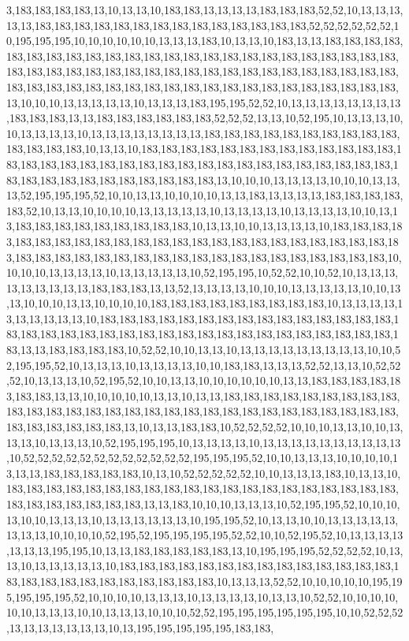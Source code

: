 3,183,183,183,183,13,10,13,13,10,183,183,13,13,13,13,183,183,183,52,52,10,13,13,13,13,13,183,183,183,183,183,183,183,183,183,183,183,183,183,183,52,52,52,52,52,52,10,195,195,195,10,10,10,10,10,10,13,13,13,183,10,13,13,10,183,13,13,183,183,183,183,183,183,183,183,183,183,183,183,183,183,183,183,183,183,183,183,183,183,183,183,183,183,183,183,183,183,183,183,183,183,183,183,183,183,183,183,183,183,183,183,183,183,183,183,183,183,183,183,183,183,183,183,183,183,183,183,183,183,183,183,13,10,10,10,13,13,13,13,13,10,13,13,13,183,195,195,52,52,10,13,13,13,13,13,13,13,13,183,183,183,13,13,183,183,183,183,183,183,52,52,52,13,13,10,52,195,10,13,13,13,10,10,13,13,13,13,10,13,13,13,13,13,13,13,13,183,183,183,183,183,183,183,183,183,183,183,183,183,183,10,13,13,10,183,183,183,183,183,183,183,183,183,183,183,183,183,183,183,183,183,183,183,183,183,183,183,183,183,183,183,183,183,183,183,183,183,183,183,183,183,183,183,183,183,183,183,183,13,10,10,10,13,13,13,13,10,10,10,13,13,13,52,195,195,195,52,10,10,13,13,10,10,10,10,13,13,183,13,13,13,13,183,183,183,183,183,52,10,13,13,10,10,10,10,13,13,13,13,13,10,13,13,13,13,10,13,13,13,13,10,10,13,13,183,183,183,183,183,183,183,183,183,10,13,13,10,10,13,13,13,13,10,183,183,183,183,183,183,183,183,183,183,183,183,183,183,183,183,183,183,183,183,183,183,183,183,183,183,183,183,183,183,183,183,183,183,183,183,183,183,183,183,183,183,183,10,10,10,10,13,13,13,13,10,13,13,13,13,13,10,52,195,195,10,52,52,10,10,52,10,13,13,13,13,13,13,13,13,13,183,183,183,13,13,52,13,13,13,13,10,10,10,13,13,13,13,13,10,10,13,13,10,10,10,13,13,10,10,10,10,183,183,183,183,183,183,183,183,183,10,13,13,13,13,13,13,13,13,13,13,10,183,183,183,183,183,183,183,183,183,183,183,183,183,183,183,183,183,183,183,183,183,183,183,183,183,183,183,183,183,183,183,183,183,183,183,183,13,13,183,183,183,183,10,52,52,10,10,13,13,10,13,13,13,13,13,13,13,13,13,10,10,52,195,195,52,10,13,13,13,10,13,13,13,13,10,10,183,183,13,13,13,52,52,13,13,10,52,52,52,10,13,13,13,10,52,195,52,10,10,13,13,10,10,10,10,10,10,13,13,183,183,183,183,183,183,183,13,13,10,10,10,10,10,13,13,10,13,13,183,183,183,183,183,183,183,183,183,183,183,183,183,183,183,183,183,183,183,183,183,183,183,183,183,183,183,183,183,183,183,183,183,183,183,13,10,13,13,183,183,10,52,52,52,52,10,10,10,13,13,10,10,13,13,13,10,13,13,13,10,52,195,195,195,10,13,13,13,13,10,13,13,13,13,13,13,13,13,13,13,10,52,52,52,52,52,52,52,52,52,52,52,52,195,195,195,52,10,10,13,13,13,10,10,10,10,13,13,13,183,183,183,183,183,10,13,10,52,52,52,52,52,10,10,13,13,13,183,10,13,13,10,183,183,183,183,183,183,183,183,183,183,183,183,183,183,183,183,183,183,183,183,183,183,183,183,183,183,183,13,13,183,10,10,10,13,13,13,10,52,195,195,52,10,10,10,13,10,10,13,13,13,10,13,13,13,13,13,13,10,195,195,52,10,13,13,10,10,13,13,13,13,13,13,13,13,10,10,10,10,52,195,52,195,195,195,195,52,52,10,10,52,195,52,10,13,13,13,13,13,13,13,195,195,10,13,13,183,183,183,183,183,13,10,195,195,195,52,52,52,52,10,13,13,10,13,13,13,13,13,10,183,183,183,183,183,183,183,183,183,183,183,183,183,183,183,183,183,183,183,183,183,183,183,183,183,10,13,13,13,52,52,10,10,10,10,10,195,195,195,195,195,52,10,10,10,10,13,13,13,10,13,13,13,13,10,13,13,10,52,52,10,10,10,10,10,10,13,13,13,10,10,13,13,13,10,10,10,52,52,195,195,195,195,195,195,10,10,52,52,52,13,13,13,13,13,13,13,10,13,195,195,195,195,195,183,183,
